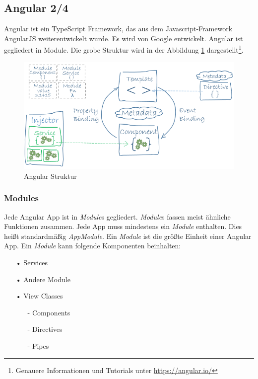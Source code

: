 \subsection{Angular 2/4}
\label{sec:vor-angular}
Angular ist ein TypeScript Framework, das aus dem Javascript-Framework AngularJS weiterentwickelt wurde. Es wird von Google entwickelt. Angular ist gegliedert in Module. Die grobe Struktur wird in der Abbildung \ref{Angular Struktur} dargestellt\footnote{Genauere Informationen und Tutorials unter \url{https://angular.io/}}.

\begin{figure}[H]
      \includegraphics[width=1\textwidth]{Bilder/Greistorfer/Angular}
      \caption[Angular Struktur]{Angular Struktur\protect\footnotemark}
      \label{Angular Struktur}
\end{figure}


\subsubsection{Modules}
\label{sec:ang-modules}
Jede Angular App ist in \textit{Module}s gegliedert. \textit{Module}s fassen meist ähnliche Funktionen zusammen. Jede App muss mindestens ein \textit{Module} enthalten. Dies heißt standardmäßig \textit{AppModule}. Ein \textit{Module} ist die größte Einheit einer Angular App.  Ein \textit{Module} kann folgende Komponenten beinhalten:

\begin{itemize}
\item[•]Services
\item[•]Andere Module
\item[•]View Classes
\begin{itemize}
\item[-]Components
\item[-]Directives
\item[-]Pipes
\end{itemize}
\end{itemize}

